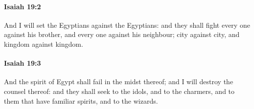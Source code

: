 		\paragraph{Isaiah 19:2} %
			\label{ISAIAH-19-2}

			And I will set the Egyptians against the Egyptians: and they shall fight every one against his brother, and every one against his neighbour; city against city, and kingdom against kingdom.


		\paragraph{Isaiah 19:3} %
			\label{ISAIAH-19-3}

			And the spirit of Egypt shall fail in the midst thereof; and I will destroy the counsel thereof: and they shall seek to the idols, and to the charmers, and to them that have familiar spirits, and to the wizards.

